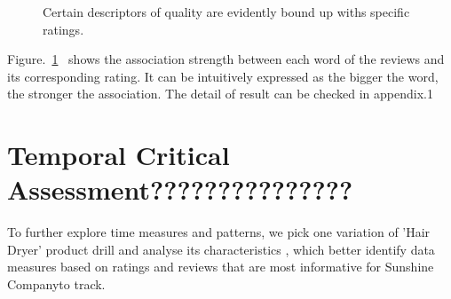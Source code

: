 \documentclass[12pt]{article}%
\begin{document}
\begin{figure}[H]
	\centering
	
	\caption{Certain descriptors of quality are evidently bound up withs specific ratings.}
	\label{fig2}
\end{figure}
Figure.~\ref{fig2}~ shows the association strength between each word of the reviews and its corresponding rating. It can be intuitively expressed as the bigger the word, the stronger the association. The detail of result can be checked in appendix.1 



\section{Temporal Critical Assessment???????????????}

To further explore time measures and patterns, we pick one variation of 'Hair Dryer' product drill and analyse its characteristics%
, which better identify data measures based on ratings and reviews that are most informative for Sunshine Companyto track.


\end{document}
